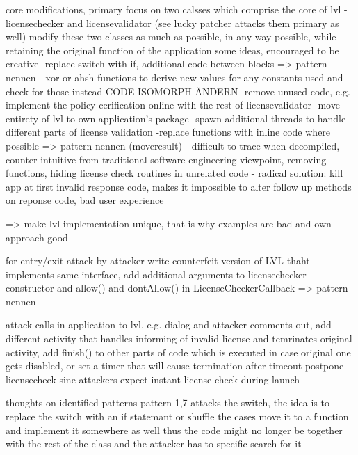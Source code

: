 core modifications, primary focus on two calsses which comprise the core of \gls{lvl} - licensechecker and licensevalidator (see lucky patcher attacks them primary as well) \cite{developersSecuring}
modify these two classes as much as possible, in any way possible, while retaining the original function of the application \cite{developersSecuring}
some ideas, encouraged to be creative \cite{developersSecuring}
-replace switch with if, additional code between blocks => pattern nennen \cite{developersSecuring}
- xor or ahsh functions to derive new values for any constants used and check for those instead CODE ISOMORPH ÄNDERN\cite{developersSecuring}
-remove unused code, e.g. implement the policy cerification online with the rest of licensevalidator \cite{developersSecuring}
-move entirety of \gls{lvl} to own application's package \cite{developersSecuring}
-spawn additional threads to handle different parts of license validation \cite{developersSecuring}
-replace functions with inline code where possible => pattern nennen (moveresult) \cite{developersSecuring}
- difficult to trace when decompiled, counter intuitive from traditional software engineering viewpoint, removing functions, hiding license check routines in unrelated code\cite{developersSecuring}
- radical solution: kill app at first invalid response code, makes it impossible to alter follow up methods on reponse code, bad user experience

=> make lvl implementation unique, that is why examples are bad and own approach good \cite{developersSecuring}

for entry/exit \cite{developersSecuring}
attack by attacker write counterfeit version of LVL thaht implements same interface, add additional arguments to licensechecker constructor and allow() and dontAllow() in LicenseCheckerCallback => pattern nennen \cite{developersSecuring}

attack calls in application to lvl, e.g. dialog and attacker comments out, add different activity that handles informing of invalid license and temrinates original activity, add finish() to other parts of code which is executed in case original one gets disabled, or set a timer that will cause termination after timeout \cite{developersSecuring}
postpone licensecheck sine attackers expect instant license check during launch \cite{developersSecuring}

thoughts on identified patterns
pattern 1,7 attacks the switch, the idea is to replace the switch with an if statemant or shuffle the cases
move it to a function and implement it somewhere as well thus the code might no longer be together with the rest of the class and the attacker has to specific search for it

